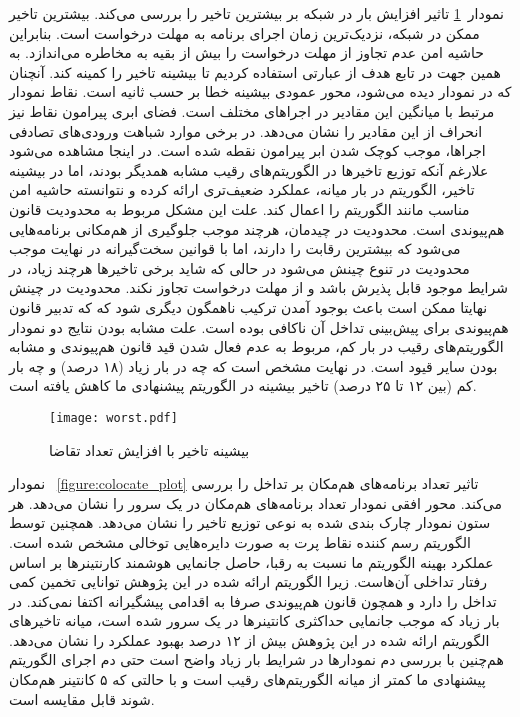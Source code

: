 نمودار~\ref{figure:worst_plot} تاثیر افزایش بار در شبکه بر بیشترین تاخیر را بررسی می‌کند. بیشترین تاخیر ممکن در شبکه، نزدیک‌ترین زمان اجرای برنامه به مهلت درخواست است. بنابراین حاشیه امن عدم تجاوز از مهلت درخواست را بیش از بقیه به مخاطره می‌اندازد. به همین جهت در تابع هدف از عبارتی استفاده کردیم تا بیشینه تاخیر را کمینه کند. آنچنان که در نمودار دیده می‌شود، محور عمودی بیشینه خطا بر حسب ثانیه است. نقاط نمودار مرتبط با میانگین این مقادیر در اجراهای مختلف است. فضای ابری پیرامون نقاط نیز انحراف از این مقادیر را نشان می‌دهد. در برخی موارد شباهت ورودی‌های تصادفی اجراها، موجب کوچک شدن ابر پیرامون نقطه شده است. در اینجا مشاهده می‌شود علارغم آنکه توزیع تاخیر‌ها در الگوریتم‌های رقیب مشابه همدیگر بودند، اما در بیشینه تاخیر، الگوریتم  در بار میانه، عملکرد ضعیف‌تری ارائه کرده و نتوانسته حاشیه امن مناسب مانند الگوریتم  را اعمال کند. علت این مشکل مربوط به محدودیت قانون هم‌پیوندی است. محدودیت در چیدمان، هرچند موجب جلوگیری از هم‌مکانی برنامه‌هایی می‌شود که بیشترین رقابت را دارند، اما با قوانین سخت‌گیرانه در نهایت موجب محدودیت در تنوع چینش می‌شود در حالی که شاید برخی تاخیرها هرچند زیاد، در شرایط موجود قابل پذیرش باشد و از مهلت درخواست تجاوز نکند. محدودیت در چینش نهایتا ممکن است باعث بوجود آمدن ترکیب ناهمگون دیگری شود که که تدبیر قانون هم‌پیوندی برای پیش‌بینی تداخل آن ناکافی بوده است. علت مشابه بودن نتایج دو نمودار الگوریتم‌های رقیب در بار کم، مربوط به عدم فعال شدن قید قانون هم‌پیوندی و مشابه بودن سایر قیود است. در نهایت مشخص است که چه در بار زیاد (۱۸ درصد) و چه بار کم (بین ۱۲ تا ۲۵ درصد) تاخیر بیشینه در الگوریتم پیشنهادی ما کاهش یافته است.

\vspace{0.5cm}
\begin{figure}[h]
\centering
\texttt{[image: worst.pdf]}
\caption{بیشینه تاخیر با افزایش تعداد تقاضا}
\label{figure:worst_plot}
\end{figure}
\vspace{0.5cm}

نمودار ~\ref{figure:colocate_plot} تاثیر تعداد برنامه‌های هم‌مکان بر تداخل را بررسی می‌کند. محور افقی نمودار تعداد برنامه‌های هم‌مکان در یک سرور را نشان می‌دهد. هر ستون نمودار چارک بندی شده به نوعی توزیع تاخیر را نشان می‌دهد. همچنین توسط الگوریتم رسم کننده نقاط پرت به صورت دایره‌هایی توخالی مشخص شده است. عملکرد بهینه الگوریتم ما نسبت به رقبا، حاصل جانمایی هوشمند کارنتینرها بر اساس رفتار تداخلی آن‌هاست. زیرا الگوریتم ارائه شده در این پژوهش توانایی تخمین کمی تداخل را دارد و همچون قانون هم‌پیوندی صرفا به اقدامی پیشگیرانه اکتفا نمی‌کند. در بار زیاد که موجب جانمایی حداکثری کانتینرها در یک سرور شده است، میانه تاخیرهای الگوریتم ارائه شده در این پژوهش بیش از ۱۲ درصد بهبود عملکرد را نشان می‌دهد. هم‌چنین با بررسی دم نمودارها در شرایط بار زیاد واضح است حتی دم اجرای الگوریتم پیشنهادی ما کمتر از میانه الگوریتم‌های رقیب است و با حالتی که ۵ کانتینر هم‌مکان شوند قابل مقایسه است.

